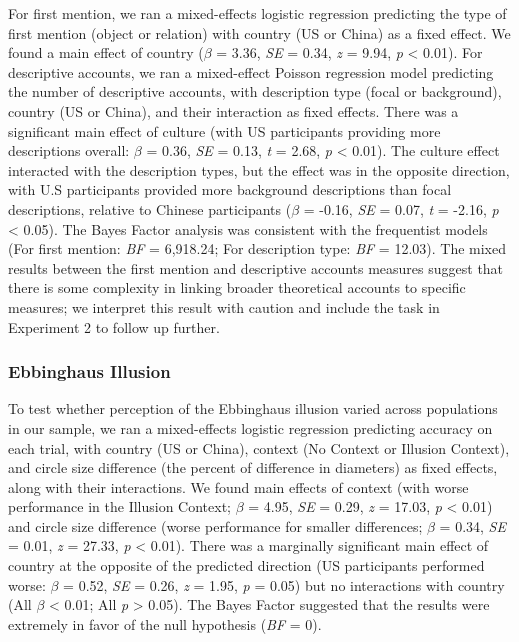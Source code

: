 \documentclass[
  man]{apa6}
\begin{document}
For first mention, we ran a mixed-effects logistic regression predicting the type of first mention (object or relation) with country (US or China) as a fixed effect. We found a main effect of country (\(\beta\) = 3.36, \emph{SE} = 0.34, \emph{z} = 9.94, \emph{p} \textless{} 0.01). For descriptive accounts, we ran a mixed-effect Poisson regression model predicting the number of descriptive accounts, with description type (focal or background), country (US or China), and their interaction as fixed effects. There was a significant main effect of culture (with US participants providing more descriptions overall: \(\beta\) = 0.36, \emph{SE} = 0.13, \emph{t} = 2.68, \emph{p} \textless{} 0.01). The culture effect interacted with the description types, but the effect was in the opposite direction, with U.S participants provided more background descriptions than focal descriptions, relative to Chinese participants (\(\beta\) = -0.16, \emph{SE} = 0.07, \emph{t} = -2.16, \emph{p} \textless{} 0.05). The Bayes Factor analysis was consistent with the frequentist models (For first mention: \emph{BF} = 6,918.24; For description type: \emph{BF} = 12.03). The mixed results between the first mention and descriptive accounts measures suggest that there is some complexity in linking broader theoretical accounts to specific measures; we interpret this result with caution and include the task in Experiment 2 to follow up further.

\hypertarget{ebbinghaus-illusion-1}{%
\subsubsection{Ebbinghaus Illusion}\label{ebbinghaus-illusion-1}}

To test whether perception of the Ebbinghaus illusion varied across populations in our sample, we ran a mixed-effects logistic regression predicting accuracy on each trial, with country (US or China), context (No Context or Illusion Context), and circle size difference (the percent of difference in diameters) as fixed effects, along with their interactions. We found main effects of context (with worse performance in the Illusion Context; \(\beta\) = 4.95, \emph{SE} = 0.29, \emph{z} = 17.03, \emph{p} \textless{} 0.01) and circle size difference (worse performance for smaller differences; \(\beta\) = 0.34, \emph{SE} = 0.01, \emph{z} = 27.33, \emph{p} \textless{} 0.01). There was a marginally significant main effect of country at the opposite of the predicted direction (US participants performed worse: \(\beta\) = 0.52, \emph{SE} = 0.26, \emph{z} = 1.95, \emph{p} = 0.05) but no interactions with country (All \(\beta\) \textless{} 0.01; All \emph{p} \textgreater{} 0.05). The Bayes Factor suggested that the results were extremely in favor of the null hypothesis (\emph{BF} = 0).
\end{document}
